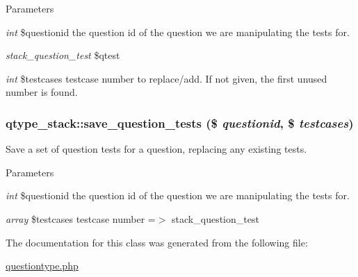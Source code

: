 \begin{DoxyParams}{Parameters}
\item[{\em int}]\$questionid the question id of the question we are manipulating the tests for. \item[{\em stack\_\-question\_\-test}]\$qtest \item[{\em int}]\$testcases testcase number to replace/add. If not given, the first unused number is found. \end{DoxyParams}
\hypertarget{classqtype__stack_a6a27f641cbeec3bfc2c36d914e3a59f4}{
\subsubsection[{save\_\-question\_\-tests}]{\setlength{\rightskip}{0pt plus 5cm}qtype\_\-stack::save\_\-question\_\-tests (\$ {\em questionid}, \/  \$ {\em testcases})}}
\label{classqtype__stack_a6a27f641cbeec3bfc2c36d914e3a59f4}
Save a set of question tests for a question, replacing any existing tests. 
\begin{DoxyParams}{Parameters}
\item[{\em int}]\$questionid the question id of the question we are manipulating the tests for. \item[{\em array}]\$testcases testcase number =$>$ stack\_\-question\_\-test \end{DoxyParams}


The documentation for this class was generated from the following file:\begin{DoxyCompactItemize}
\item 
\hyperlink{questiontype_8php}{questiontype.php}\end{DoxyCompactItemize}
